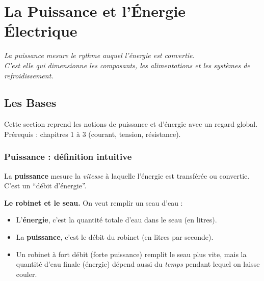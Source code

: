 \documentclass[12pt,a4paper,twoside]{book}
\begin{document}
\chapter{La Puissance et l'Énergie Électrique}

\begin{center}
\textit{La puissance mesure le rythme auquel l'énergie est convertie.\\
C'est elle qui dimensionne les composants, les alimentations et les systèmes de refroidissement.}
\end{center}

\vspace{0.5cm}

\section{Les Bases}

\begin{bases}
Cette section reprend les notions de puissance et d'énergie avec un regard global. Prérequis : chapitres 1 à 3 (courant, tension, résistance).
\end{bases}

\subsection{Puissance : définition intuitive}

La \textbf{puissance} mesure la \textit{vitesse} à laquelle l'énergie est transférée ou convertie. C'est un ``débit d'énergie''.

\begin{analogie}
\textbf{Le robinet et le seau.} On veut remplir un seau d'eau :
\begin{itemize}[nosep]
\item L'\textbf{énergie}, c'est la quantité totale d'eau dans le seau (en litres).
\item La \textbf{puissance}, c'est le débit du robinet (en litres par seconde).
\item Un robinet à fort débit (forte puissance) remplit le seau plus vite, mais la quantité d'eau finale (énergie) dépend aussi du \textit{temps} pendant lequel on laisse couler.
\end{itemize}
\end{analogie}
\end{document}
